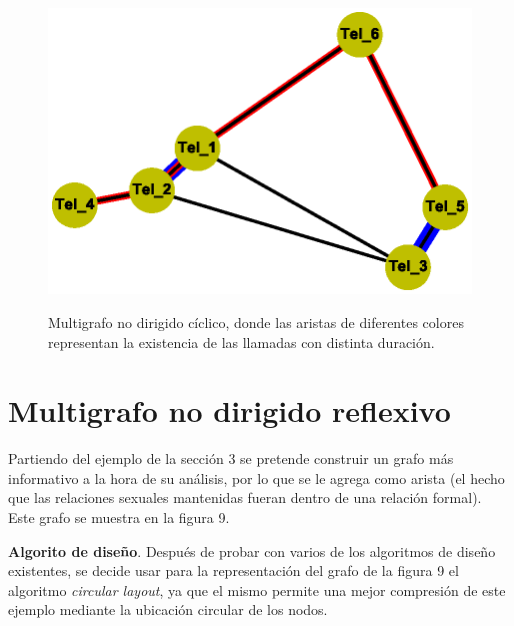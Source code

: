\documentclass{article}
\begin{document}
\begin{center}

\end{center}
\begin{figure}[h]
\begin{center}
\includegraphics[scale=0.7]{Graf8_spectral_layout.eps}\\
\caption{Multigrafo no dirigido cíclico, donde las aristas de diferentes colores representan la existencia de las llamadas con distinta duración.}
\end{center}
\end{figure}
\section{Multigrafo no dirigido reflexivo}
Partiendo del ejemplo de la sección 3 se pretende construir un grafo más informativo a la hora de su análisis, por lo que se le agrega como arista (el hecho que las relaciones sexuales mantenidas fueran dentro de una relación formal). Este grafo se muestra en la figura 9.

\textbf{Algorito de diseño}.
Después de probar con varios de los algoritmos de diseño existentes, se decide usar para la representación del grafo de la figura 9 el algoritmo \textit{circular layout}, ya que el mismo permite una mejor compresión de este ejemplo mediante la ubicación circular de los nodos.
\end{document}
